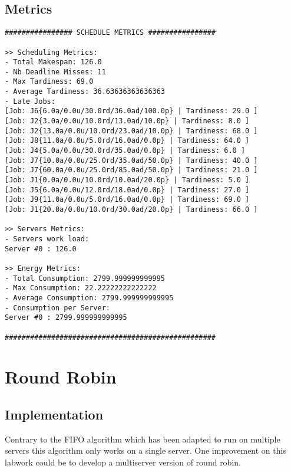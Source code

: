 \documentclass[./report.tex]{subfiles}
\begin{document}
\newpage
\subsection{Metrics}
\begin{lstlisting}[style=txt, caption={Metrics for FIFO on a single server}]
################ SCHEDULE METRICS ################

>> Scheduling Metrics: 
- Total Makespan: 126.0
- Nb Deadline Misses: 11
- Max Tardiness: 69.0
- Average Tardiness: 36.63636363636363
- Late Jobs: 
[Job: J6{6.0a/0.0u/30.0rd/36.0ad/100.0p} | Tardiness: 29.0 ]
[Job: J2{3.0a/0.0u/10.0rd/13.0ad/10.0p} | Tardiness: 8.0 ]
[Job: J2{13.0a/0.0u/10.0rd/23.0ad/10.0p} | Tardiness: 68.0 ]
[Job: J8{11.0a/0.0u/5.0rd/16.0ad/0.0p} | Tardiness: 64.0 ]
[Job: J4{5.0a/0.0u/30.0rd/35.0ad/0.0p} | Tardiness: 6.0 ]
[Job: J7{10.0a/0.0u/25.0rd/35.0ad/50.0p} | Tardiness: 40.0 ]
[Job: J7{60.0a/0.0u/25.0rd/85.0ad/50.0p} | Tardiness: 21.0 ]
[Job: J1{0.0a/0.0u/10.0rd/10.0ad/20.0p} | Tardiness: 5.0 ]
[Job: J5{6.0a/0.0u/12.0rd/18.0ad/0.0p} | Tardiness: 27.0 ]
[Job: J9{11.0a/0.0u/5.0rd/16.0ad/0.0p} | Tardiness: 69.0 ]
[Job: J1{20.0a/0.0u/10.0rd/30.0ad/20.0p} | Tardiness: 66.0 ]

>> Servers Metrics: 
- Servers work load:
Server #0 : 126.0

>> Energy Metrics: 
- Total Consumption: 2799.999999999995
- Max Consumption: 22.22222222222222
- Average Consumption: 2799.999999999995
- Consumption per Server: 
Server #0 : 2799.999999999995

##################################################
\end{lstlisting}


\newpage
\section{Round Robin}
\subsection{Implementation}

Contrary to the FIFO algorithm which has been adapted to run on multiple servers this algorithm only works on a single server. One improvement on this labwork could be to develop a multiserver version of round robin.
\end{document}
